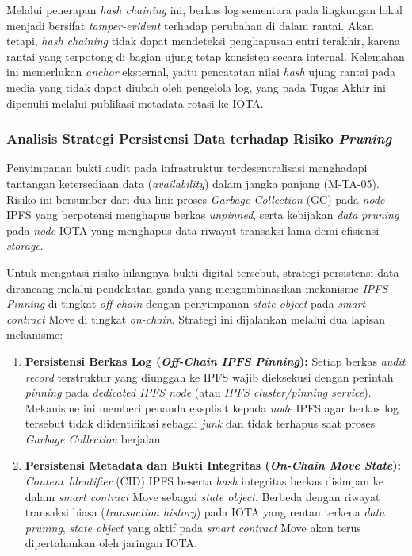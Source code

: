 Melalui penerapan \textit{hash chaining} ini, berkas log sementara pada
lingkungan lokal menjadi bersifat \textit{tamper-evident} terhadap perubahan di
dalam rantai. Akan tetapi, \textit{hash chaining} tidak dapat mendeteksi
penghapusan entri terakhir, karena rantai yang terpotong di bagian ujung tetap
konsisten secara internal. Kelemahan ini memerlukan \textit{anchor} eksternal,
yaitu pencatatan nilai \textit{hash} ujung rantai pada media yang tidak dapat
diubah oleh pengelola log, yang pada Tugas Akhir ini dipenuhi melalui publikasi
metadata rotasi ke IOTA.

\subsubsection{Analisis Strategi Persistensi Data terhadap Risiko \textit{Pruning}}
\label{subsubsec:analisis-persistensi-data}

Penyimpanan bukti audit pada infrastruktur terdesentralisasi menghadapi tantangan ketersediaan data (\textit{availability}) dalam jangka panjang (M-TA-05). Risiko ini bersumber dari dua lini: proses \textit{Garbage Collection} (GC) pada \textit{node} IPFS yang berpotensi menghapus berkas \textit{unpinned}, serta kebijakan \textit{data pruning} pada \textit{node} IOTA yang menghapus data riwayat transaksi lama demi efisiensi \textit{storage}.

Untuk mengatasi risiko hilangnya bukti digital tersebut, strategi persistensi data dirancang melalui pendekatan ganda yang mengombinasikan mekanisme \textit{IPFS Pinning} di tingkat \textit{off-chain} dengan penyimpanan \textit{state object} pada \textit{smart contract} Move di tingkat \textit{on-chain}. Strategi ini dijalankan melalui dua lapisan mekanisme:

\begin{enumerate}
    \item \textbf{Persistensi Berkas Log (\textit{Off-Chain IPFS Pinning}):} Setiap berkas \textit{audit record} terstruktur yang diunggah ke IPFS wajib dieksekusi dengan perintah \textit{pinning} pada \textit{dedicated IPFS node} (atau \textit{IPFS cluster/pinning service}). Mekanisme ini memberi penanda eksplisit kepada \textit{node} IPFS agar berkas log tersebut tidak diidentifikasi sebagai \textit{junk} dan tidak terhapus saat proses \textit{Garbage Collection} berjalan.
    \item \textbf{Persistensi Metadata dan Bukti Integritas (\textit{On-Chain Move State}):} \textit{Content Identifier} (CID) IPFS beserta \textit{hash} integritas berkas disimpan ke dalam \textit{smart contract} Move sebagai \textit{state object}. Berbeda dengan riwayat transaksi biasa (\textit{transaction history}) pada IOTA yang rentan terkena \textit{data pruning}, \textit{state object} yang aktif pada \textit{smart contract} Move akan terus dipertahankan oleh jaringan IOTA.
\end{enumerate}

